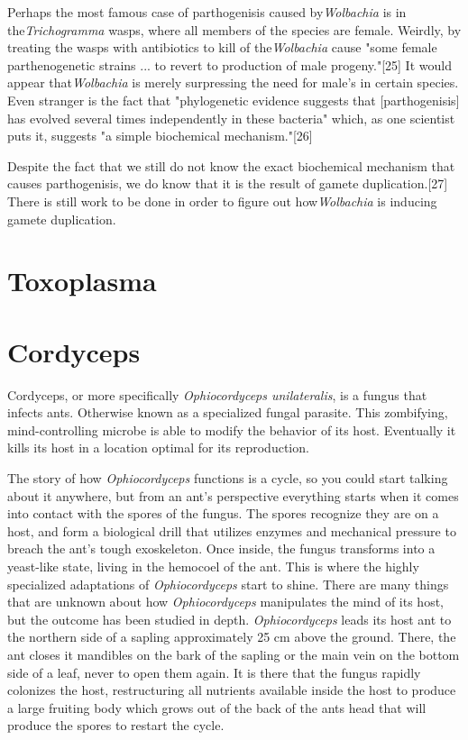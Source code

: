 \documentclass[twocolumn]{article}
\begin{document}
Perhaps the most famous case of parthogenisis caused by\textit{Wolbachia} is in the\textit{Trichogramma} wasps, where all members of the species are female. Weirdly, by treating the wasps with antibiotics to kill of the\textit{Wolbachia} cause "some female parthenogenetic strains ... to revert to production of male progeny."[25] It would appear that\textit{Wolbachia} is merely surpressing the need for male's in certain species. Even stranger is the fact that "phylogenetic evidence suggests that [parthogenisis] has evolved several times independently in these bacteria" which, as one scientist puts it, suggests "a simple biochemical mechanism."[26]  

Despite the fact that we still do not know the exact biochemical mechanism that causes parthogenisis, we do know that it is the result of gamete duplication.[27] There is still work to be done in order to figure out how\textit{Wolbachia} is inducing gamete duplication.

\section*{Toxoplasma}

\section*{Cordyceps}
Cordyceps, or more specifically \textit{Ophiocordyceps unilateralis}, is a fungus that infects ants. Otherwise known as a specialized fungal parasite. This zombifying, mind-controlling microbe is able to modify the behavior of its host. Eventually it kills its host in a location optimal for its reproduction. 

The story of how \textit{Ophiocordyceps} functions is a cycle, so you could start talking about it anywhere, but from an ant's perspective everything starts when it comes into contact with the spores of the fungus. The spores recognize they are on a host, and form a biological drill that utilizes enzymes and mechanical pressure to breach the ant's tough exoskeleton. Once inside, the fungus transforms into a yeast-like state, living in the hemocoel of the ant.\cite{cordy_infection} This is where the highly specialized adaptations of \textit{Ophiocordyceps} start to shine. There are many things that are unknown about how \textit{Ophiocordyceps} manipulates the mind of its host, but the outcome has been studied in depth. \textit{Ophiocordyceps} leads its host ant to the northern side of a sapling approximately 25 cm above the ground. There, the ant closes it mandibles on the bark of the sapling or the main vein on the bottom side of a leaf, never to open them again. It is there that the fungus rapidly colonizes the host, restructuring all nutrients available inside the host to produce a large fruiting body which grows out of the back of the ants head that will produce the spores to restart the cycle.\cite{life_of_dead_ant}
\end{document}
